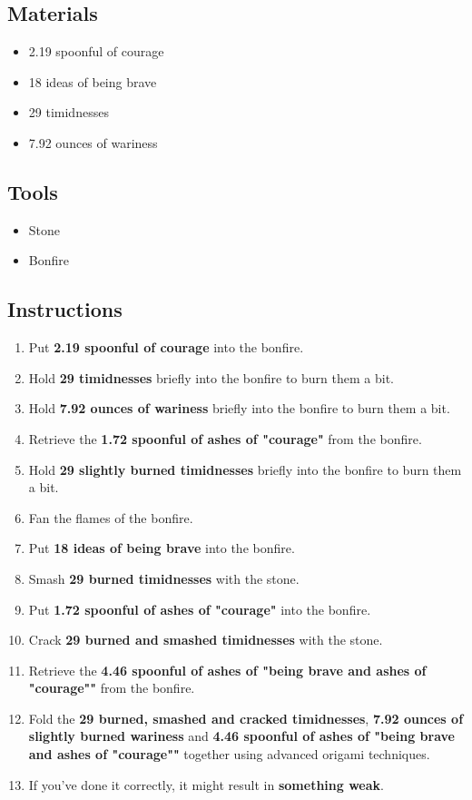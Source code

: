 \documentclass{article}
\begin{document}
\subsection{Materials}\begin{itemize}
\item 
2.19 spoonful of courage
\item 
18 ideas of being brave
\item 
29 timidnesses
\item 
7.92 ounces of wariness
\end{itemize}
\subsection{Tools}\begin{itemize}
\item 
Stone
\item 
Bonfire
\end{itemize}
\subsection{Instructions}\begin{enumerate}
\item 
Put \textbf{2.19 spoonful of courage} into the bonfire.
\item 
Hold \textbf{29 timidnesses} briefly into the bonfire to burn them a bit.
\item 
Hold \textbf{7.92 ounces of wariness} briefly into the bonfire to burn them a bit.
\item 
Retrieve the \textbf{1.72 spoonful of ashes of "courage"} from the bonfire.
\item 
Hold \textbf{29 slightly burned timidnesses} briefly into the bonfire to burn them a bit.
\item 
Fan the flames of the bonfire.
\item 
Put \textbf{18 ideas of being brave} into the bonfire.
\item 
Smash \textbf{29 burned timidnesses} with the stone.
\item 
Put \textbf{1.72 spoonful of ashes of "courage"} into the bonfire.
\item 
Crack \textbf{29 burned and smashed timidnesses} with the stone.
\item 
Retrieve the \textbf{4.46 spoonful of ashes of "being brave and ashes of "courage""} from the bonfire.
\item 
Fold the \textbf{29 burned, smashed and cracked timidnesses}, \textbf{7.92 ounces of slightly burned wariness} and \textbf{4.46 spoonful of ashes of "being brave and ashes of "courage""} together using advanced origami techniques.
\item 
If you've done it correctly, it might result in \textbf{something weak}.
\end{enumerate}
\newpage
\end{document}
